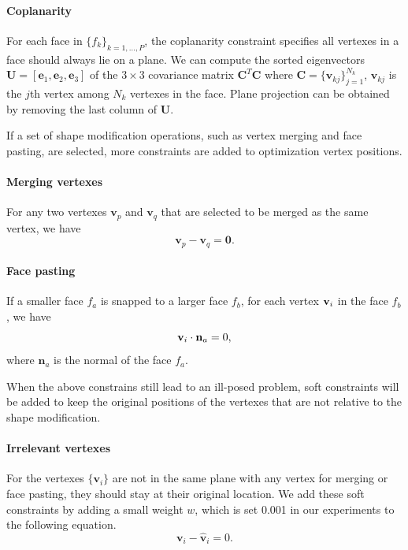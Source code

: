 \paragraph{Coplanarity} {For each face in  $\{f_k\}_{k=1,\dots,P}$, the coplanarity constraint specifies all vertexes in a face should always lie on a plane. 
We can compute the sorted eigenvectors $\mathbf{U} = [\mathbf{e}_1, \mathbf{e}_2, \mathbf{e}_3]$ of the $ 3 \times 3$ covariance matrix $\mathbf{C}^T\mathbf{C}$ where $\mathbf{C} = \{\mathbf{v}_{kj}\}_{j=1}^{N_k}$, $\mathbf{v}_{kj}$ is the $j$th vertex among $N_k$ vertexes in the face. Plane projection can be obtained by removing the last column of $\mathbf{U}$. 


If a set of shape modification operations, such as vertex merging and face pasting, are selected, more constraints are added to optimization vertex positions. 
%

\paragraph{Merging vertexes} 
For any two vertexes $\mathbf{v}_p$ and $\mathbf{v}_q$ that are selected to be merged as the same vertex, we have 
\begin{equation}
\mathbf{v}_p - \mathbf{v}_q = \mathbf{0}.
\label{equ:point}
\end{equation}

\paragraph{Face pasting} 
If a smaller face $f_a$ is snapped to a larger face $f_b$, for each vertex $\mathbf{v}_i$ in the face $f_b$, we have
\begin{equation} \label{eq:face-paste}
\mathbf{v}_i \cdot \mathbf{n}_a = 0,
\end{equation}
where $\mathbf{n}_a$ is the normal of the face $f_a$.


When the above constrains still lead to an ill-posed problem, soft constraints will be added to keep the original positions of the vertexes that are not relative to the shape modification. 

\paragraph{Irrelevant vertexes} For the vertexes $\{\mathbf{v}_i\}$ are not in the same plane with any vertex for merging or face pasting, they should stay at their original location. 
We add these soft constraints by adding a small weight $w$, which is set 0.001 in our experiments to the following equation. 
\begin{equation}
\mathbf{v}_i - \mathbf{\hat{v}}_i = 0.
\label{equ:irrelevant}
\end{equation}

}
